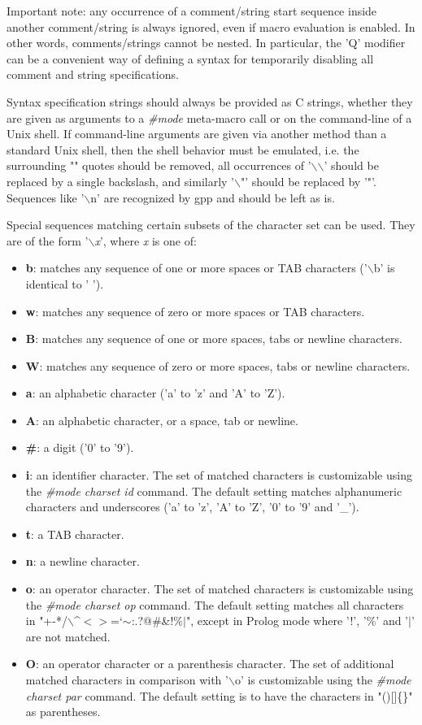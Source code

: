 Important note: any occurrence of a comment/string start sequence inside
another comment/string is always ignored, even if macro evaluation is
enabled. In other words, comments/strings cannot be nested. In particular, 
the 'Q' modifier can be a convenient way of defining a syntax for 
temporarily disabling all comment and string specifications.


Syntax specification strings should always be provided as C strings, 
whether they are given as arguments to a {\it \#mode} meta-macro call or
on the command-line of a Unix shell. If command-line arguments are given
via another method than a standard Unix shell, then the shell behavior
must be emulated, i.e. the surrounding "" quotes should be removed,
all occurrences of '$\backslash$$\backslash$' should be replaced by a single backslash,
and similarly '$\backslash$"' should be replaced by '"'.
Sequences like '$\backslash$n' are recognized by gpp and should be left as is.


Special sequences matching certain subsets of the character set can be
used. They are of the form '$\backslash${\it x}', where {\it x} is one of:
\begin{itemize}
\item
{\bf b}: 
matches any sequence of one or more spaces or TAB characters ('$\backslash$b' is 
identical to ' ').
\item
{\bf w}: 
matches any sequence of zero or more spaces or TAB characters.
\item
{\bf B}: 
matches any sequence of one or more spaces, tabs or newline characters.
\item
{\bf W}: 
matches any sequence of zero or more spaces, tabs or newline characters.
\item
{\bf a}: 
an alphabetic character ('a' to 'z' and 'A' to 'Z').
\item
{\bf A}: 
an alphabetic character, or a space, tab or newline.
\item
{\bf \#}: 
a digit ('0' to '9').
\item
{\bf i}: 
an identifier character. The set of matched characters is customizable
using the {\it \#mode charset id} command. The default setting matches
alphanumeric characters and underscores ('a' to 'z', 'A' to 'Z', '0' to '9'
and '\_').
\item
{\bf t}: 
a TAB character.
\item
{\bf n}: 
a newline character.
\item
{\bf o}: 
an operator character. The set of matched characters is customizable
using the {\it \#mode charset op} command. The default setting matches
all characters in "+-*/$\backslash$\^{}$<$$>$=`$\sim$:.?@\#\&!\%$|$", except in Prolog mode
where '!', '\%' and '$|$' are not matched.
\item
{\bf O}: 
an operator character or a parenthesis character. The set of additional
matched characters in comparison with '$\backslash$o' is customizable using the
{\it \#mode charset par} command. The default setting is to have the
characters in "()[]\{\}" as parentheses.\end{itemize}


